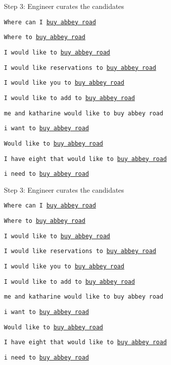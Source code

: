 \documentclass[12pt]{beamer}
\begin{document}
\begin{frame}{Step 3: Engineer curates the candidates}

  \texttt{Where can I \underline{buy abbey road}}

  \texttt{Where to \underline{buy abbey road}}

  \texttt{I would like to \underline{buy abbey road}}

  \texttt{I would like reservations to \underline{buy abbey road}}

  \texttt{I would like you to \underline{buy abbey road}}

  \texttt{I would like to add to \underline{buy abbey road}}

  \texttt{me and katharine would like to buy abbey road}

  \texttt{i want to \underline{buy abbey road}}

  \texttt{Would like to \underline{buy abbey road}}

  \texttt{I have eight that would like to \underline{buy abbey road}}

  \texttt{i need to \underline{buy abbey road}}

\end{frame}

\begin{frame}{Step 3: Engineer curates the candidates}

    \texttt{Where can I \underline{buy abbey road}}

    \texttt{Where to \underline{buy abbey road}}

    \texttt{I would like to \underline{buy abbey road}}

    {\color{red}\texttt{I would like reservations to \underline{buy abbey road}}}

    \texttt{I would like you to \underline{buy abbey road}}

    \texttt{I would like to add to \underline{buy abbey road}}

    \texttt{me and katharine would like to buy abbey road}

    \texttt{i want to \underline{buy abbey road}}

    \texttt{Would like to \underline{buy abbey road}}

    \texttt{I have eight that would like to \underline{buy abbey road}}

    \texttt{i need to \underline{buy abbey road}}

\end{frame}
\end{document}
